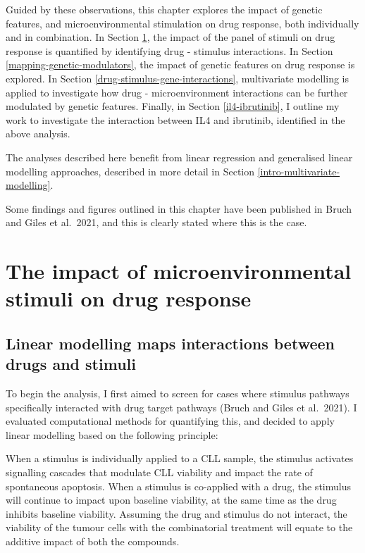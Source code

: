 \documentclass[11pt, a4paper, twosided]{book}
\begin{document}
Guided by these observations, this chapter explores the impact of genetic features, and microenvironmental stimulation on drug response, both individually and in combination. In Section \ref{mapping-interactions}, the impact of the panel of stimuli on drug response is quantified by identifying drug - stimulus interactions. In Section \ref{mapping-genetic-modulators}, the impact of genetic features on drug response is explored. In Section \ref{drug-stimulus-gene-interactions}, multivariate modelling is applied to investigate how drug - microenvironment interactions can be further modulated by genetic features. Finally, in Section \ref{il4-ibrutinib}, I outline my work to investigate the interaction between IL4 and ibrutinib, identified in the above analysis.

The analyses described here benefit from linear regression and generalised linear modelling approaches, described in more detail in Section \ref{intro-multivariate-modelling}.

Some findings and figures outlined in this chapter have been published in Bruch and Giles et al.~2021, and this is clearly stated where this is the case.

\hypertarget{mapping-interactions}{%
\section{The impact of microenvironmental stimuli on drug response}\label{mapping-interactions}}

\hypertarget{drug-stimulus-linear-model}{%
\subsection{Linear modelling maps interactions between drugs and stimuli}\label{drug-stimulus-linear-model}}

To begin the analysis, I first aimed to screen for cases where stimulus pathways specifically interacted with drug target pathways (Bruch and Giles et al.~2021). I evaluated computational methods for quantifying this, and decided to apply linear modelling based on the following principle:

When a stimulus is individually applied to a CLL sample, the stimulus activates signalling cascades that modulate CLL viability and impact the rate of spontaneous apoptosis. When a stimulus is co-applied with a drug, the stimulus will continue to impact upon baseline viability, at the same time as the drug inhibits baseline viability. Assuming the drug and stimulus do not interact, the viability of the tumour cells with the combinatorial treatment will equate to the additive impact of both the compounds.
\end{document}
